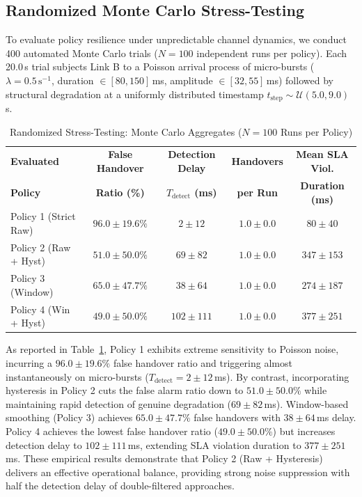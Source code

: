\documentclass[conference]{IEEEtran}
\begin{document}
\subsection{Randomized Monte Carlo Stress-Testing}
To evaluate policy resilience under unpredictable channel dynamics, we conduct 400 automated Monte Carlo trials ($N = 100$ independent runs per policy). Each 20.0\,s trial subjects Link B to a Poisson arrival process of micro-bursts ($\lambda = 0.5\,\text{s}^{-1}$, duration $\in [80, 150]$\,ms, amplitude $\in [32, 55]$\,ms) followed by structural degradation at a uniformly distributed timestamp $t_{\text{step}} \sim \mathcal{U}(5.0, 9.0)$\,s.

\begin{table}[htbp]
\caption{Randomized Stress-Testing: Monte Carlo Aggregates ($N = 100$ Runs per Policy)}
\label{tab:random_comparison}
\centering
\begin{tabular}{lcccc}
\toprule
\textbf{Evaluated} & \textbf{False Handover} & \textbf{Detection Delay} & \textbf{Handovers} & \textbf{Mean SLA Viol.} \\
\textbf{Policy} & \textbf{Ratio (\%)} & \textbf{$T_{\text{detect}}$ (ms)} & \textbf{per Run} & \textbf{Duration (ms)} \\
\midrule
Policy 1 (Strict Raw)    & $96.0 \pm 19.6\%$          & $2 \pm 12$           & $1.0 \pm 0.0$          & $80 \pm 40$ \\
Policy 2 (Raw + Hyst)    & \textbf{$51.0 \pm 50.0\%$} & $69 \pm 82$          & \textbf{$1.0 \pm 0.0$} & \textbf{$347 \pm 153$} \\
Policy 3 (Window)        & $65.0 \pm 47.7\%$          & $38 \pm 64$          & $1.0 \pm 0.0$          & $274 \pm 187$ \\
Policy 4 (Win + Hyst)    & \textbf{$49.0 \pm 50.0\%$} & $102 \pm 111$        & $1.0 \pm 0.0$          & $377 \pm 251$ \\
\bottomrule
\end{tabular}
\end{table}

As reported in Table~\ref{tab:random_comparison}, Policy 1 exhibits extreme sensitivity to Poisson noise, incurring a $96.0 \pm 19.6\%$ false handover ratio and triggering almost instantaneously on micro-bursts ($T_{\text{detect}} = 2 \pm 12$\,ms). By contrast, incorporating hysteresis in Policy 2 cuts the false alarm ratio down to $51.0 \pm 50.0\%$ while maintaining rapid detection of genuine degradation ($69 \pm 82$\,ms). Window-based smoothing (Policy 3) achieves $65.0 \pm 47.7\%$ false handovers with $38 \pm 64$\,ms delay. Policy 4 achieves the lowest false handover ratio ($49.0 \pm 50.0\%$) but increases detection delay to $102 \pm 111$\,ms, extending SLA violation duration to $377 \pm 251$\,ms. These empirical results demonstrate that Policy 2 (Raw + Hysteresis) delivers an effective operational balance, providing strong noise suppression with half the detection delay of double-filtered approaches.
\end{document}
